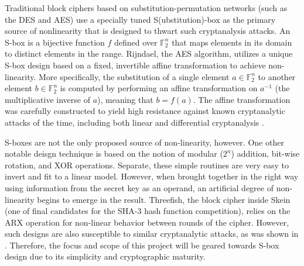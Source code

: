 \documentclass[11pt]{article}
\newcommand{\field}[1]{\mathbb{#1}} %
\begin{document}
Traditional block ciphers based on substitution-permutation networks (such as the DES and AES) use a specially tuned S(ubstitution)-box as the primary source of nonlinearity that is designed to thwart such cryptanalysis attacks. An S-box is a bijective function $f$ defined over $\field{F}_2^n$ that maps elements in its domain to distinct elements in the range. Rijndael, the AES algorithm, utilizes a unique S-box design based on a fixed, invertible affine transformation to achieve non-linearity. More specifically, the substitution of a single element $a \in \field{F}_2^n$ to another element $b \in \field{F}_2^n$ is computed by performing an affine transformation on $a^{-1}$ (the multiplicative inverse of $a$), meaning that $b = f(a)$. The affine transformation was carefully constructed to yield high resistance against known cryptanalytic attacks of the time, including both linear and differential cryptanalysis \cite{Daemen:2002:DRA}. 

S-boxes are not the only proposed source of non-linearity, however. One other notable deisgn technique is based on the notion of modular ($2^n$) addition, bit-wise rotation, and XOR operations. Separate, these simple routines are very easy to invert and fit to a linear model. However, when brought together in the right way using information from the secret key as an operand, an artificial degree of non-linearity begins to emerge in the result. Threefish, the block cipher inside Skein (one of final candidates for the SHA-3 hash function competition), relies on the ARX operation for non-linear behavior between rounds of the cipher. However, such designs are also susceptible to similar cryptanalytic attacks, as was shown in \cite{Khovratovich:2010:RCA:1876089.1876116}. Therefore, the focus and scope of this project will be geared towards S-box design due to its simplicity and cryptographic maturity.
\end{document}
